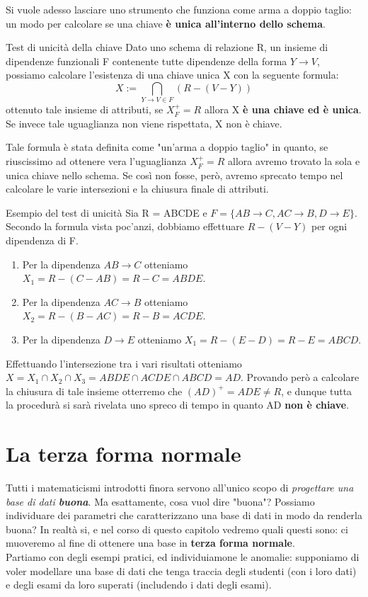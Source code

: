 \documentclass[12pt]{report}
\newcommand{\ra}{
	\rightarrow
}
\begin{document}
	Si vuole adesso lasciare uno strumento che funziona come arma a doppio taglio: un modo per calcolare se una chiave \textbf{è unica all'interno dello schema}.
	\begin{proposizione}{Test di unicità della chiave}{}
		Dato uno schema di relazione R, un insieme di dipendenze funzionali F contenente tutte dipendenze della forma $Y \ra V$, possiamo calcolare l'esistenza di una chiave unica X con la seguente formula:
		\[
			X := \bigcap_{Y \ra V \in F} (R - (V - Y))
		\]
		ottenuto tale insieme di attributi, se $X^+_F = R$ allora X \textbf{è una chiave ed è unica}. Se invece tale uguaglianza non viene rispettata, X non è chiave.
	\end{proposizione}
	Tale formula è stata definita come "un'arma a doppio taglio" in quanto, se riuscissimo ad ottenere vera l'uguaglianza $X^+_F = R$ allora avremo trovato la sola e unica chiave nello schema. Se così non fosse, però, avremo sprecato tempo nel calcolare le varie intersezioni e la chiusura finale di attributi.
	
	\begin{esempio}{Esempio del test di unicità}{}
		Sia R = ABCDE e $F = \{AB \ra C, AC \ra B, D \ra E\}$.\\
		Secondo la formula vista poc'anzi, dobbiamo effettuare $R -(V - Y)$ per ogni dipendenza di F.
		\begin{enumerate}
			\item Per la dipendenza $AB \ra C$ otteniamo $X_1 = R - (C - AB) = R - C = ABDE$.
			
			\item Per la dipendenza $AC \ra B$ otteniamo $X_2 = R - (B - AC) = R - B = ACDE$.
			
			\item Per la dipendenza $D \ra E$ otteniamo $X_1 = R - (E - D) = R - E = ABCD$.
		\end{enumerate}
		Effettuando l'intersezione tra i vari risultati otteniamo $X = X_1 \cap X_2 \cap X_3 = ABDE \cap ACDE \cap ABCD = AD$.
		Provando però a calcolare la chiusura di tale insieme otterremo che $(AD)^+ = ADE \neq R$, e dunque tutta la procedurà si sarà rivelata uno spreco di tempo in quanto AD \textbf{non è chiave}.
	\end{esempio}
	
	\chapter{La terza forma normale}
	Tutti i matematicismi introdotti finora servono all'unico scopo di \textit{progettare una base di dati \textbf{buona}}. Ma esattamente, cosa vuol dire "buona"? Possiamo individuare dei parametri che caratterizzano una base di dati in modo da renderla buona? In realtà si, e nel corso di questo capitolo vedremo quali questi sono: ci muoveremo al fine di ottenere una base in \textbf{terza forma normale}.\\
	Partiamo con degli esempi pratici, ed individuiamone le anomalie: supponiamo di voler modellare una base di dati che tenga traccia degli studenti (con i loro dati) e degli esami da loro superati (includendo i dati degli esami).
	
\end{document}
